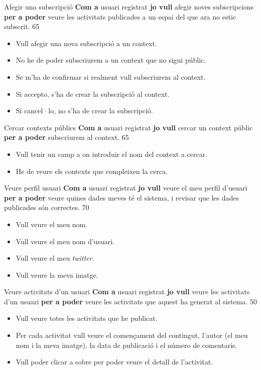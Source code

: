 \pintaHistoria
    {Afegir una subscripció}
    {\textbf{Com a} usuari registrat \textbf{jo vull} afegir noves subscripcions \textbf{per a poder} veure les activitats publicades a un espai del que ara no estic subscrit.}
    {65}
    {
    \begin{itemize}[leftmargin=0.3cm]
        \item Vull afegir una nova subscripció a un context.
        \item No he de poder subscriurem a un context que no sigui públic.
        \item Se m'ha de confirmar si realment vull subscriurem al context.
        \item Si accepto, s'ha de crear la subscripció al context.
        \item Si cancel·lo, no s'ha de crear la subscripció.
    \end{itemize}
    }

\pintaHistoria
    {Cercar contexts públics}
    {\textbf{Com a} usuari registrat \textbf{jo vull} cercar un context públic \textbf{per a poder} subscriurem al context.}
    {65}
    {
    \begin{itemize}[leftmargin=0.3cm]
        \item Vull tenir un camp a on introduir el nom del context a cercar.
        \item He de veure els contexts que compleixen la cerca.
    \end{itemize}
    }

\pintaHistoria
    {Veure perfil usuari}
    {\textbf{Com a} usuari registrat \textbf{jo vull} veure el meu perfil d'usuari \textbf{per a poder} veure quines dades meves té el sistema, i revisar que les dades publicades són correctes.}
    {70}
    {
    \begin{itemize}[leftmargin=0.3cm]
        \item Vull veure el meu nom.
        \item Vull veure el meu nom d'usuari.
        \item Vull veure el meu \textit{twitter}.
        \item Vull veure la meva imatge.
    \end{itemize}
    }

\pintaHistoria
    {Veure activitats d'un usuari}
    {\textbf{Com a} usuari registrat \textbf{jo vull} veure les activitats d'un usuari \textbf{per a poder} veure les activitats que aquest ha generat al sistema.}
    {50}
    {
    \begin{itemize}[leftmargin=0.3cm]
        \item Vull veure totes les activitats que he publicat.
        \item Per cada activitat vull veure el començament del contingut, l'autor (el meu nom i la meva imatge), la data de publicació i el número de comentaris.
        \item Vull poder clicar a sobre per poder veure el detall de l'activitat.
    \end{itemize}
    }

